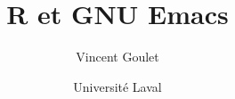 \documentclass[11pt]{memoir}
\title{R et GNU Emacs}
\author{Vincent Goulet}
\date{Université Laval}
\begin{document}
\frontmatter



\tableofcontents*

\mainmatter



\end{document}
